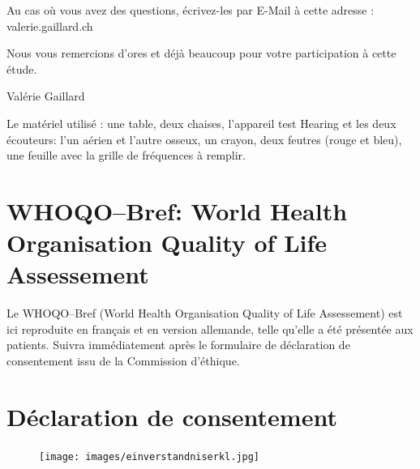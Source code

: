 Au cas où vous avez des questions, écrivez-les par E-Mail à cette adresse : valerie.gaillard\@gmx.ch

Nous vous remercions d'ores et déjà beaucoup pour votre participation
à cette étude.

Valérie Gaillard


\begin{french}
	Le matériel utilisé : une table, deux chaises, l'appareil
	test Hearing et les deux écouteurs: l'un aérien et l'autre osseux, un crayon, deux
	feutres (rouge et bleu), une feuille avec la grille de fréquences à
	remplir.
\end{french}

\section{WHOQO--Bref: World Health
   Organisation Quality of Life Assessement}

Le WHOQO--Bref (World Health
   Organisation Quality of Life Assessement) est ici reproduite en
   français et en
   version allemande, telle qu'elle a été présentée aux patients.
Suivra immédiatement après le  formulaire de déclaration de  consentement issu de la Commission 
d'éthique.











\clearpage
\section{Déclaration de consentement}
\begin{figure}[bh]
	\centering
	\texttt{[image: images/einverstandniserkl.jpg]}
	\label{fig:déclaration de consentement}
\end{figure}

%
%
%
%
%
